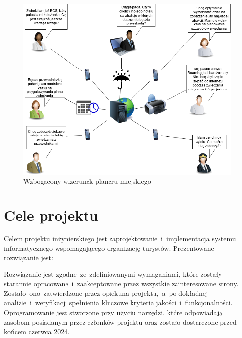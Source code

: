 \begin{figure}[h]
    \centering
    \includegraphics[width=1\textwidth]{attachments/rich-picture}
    \caption{Wzbogacony wizerunek planeru miejskiego}
    \label{fig:rich-picture}
\end{figure}

\pagebreak
\section{Cele projektu}
\label{sec:cele-projektu}

Celem projektu inżynierskiego jest zaprojektowanie~i~implementacja systemu informatycznego wspomagającego organizację turystów.
Prezentowane rozwiązanie jest:

Rozwiązanie jest zgodne~ze~zdefiniowanymi wymaganiami, które zostały starannie opracowane~i~zaakceptowane przez wszystkie zainteresowane strony.
Zostało~ono~zatwierdzone przez opiekuna projektu,~a~po dokładnej analizie~i~weryfikacji spełnienia kluczowe kryteria jakości~i~funkcjonalności.
Oprogramowanie jest stworzone przy użyciu narzędzi, które odpowiadają zasobom posiadanym przez członków projektu oraz zostało dostarczone przed końcem czerwca 2024.


